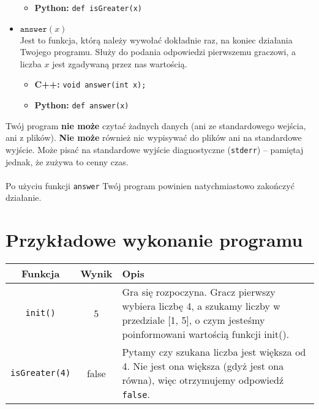 \documentclass[zad,zawodnik,utf8]{sinol}
\begin{document}
\begin{tasktext}
\begin{itemize}
\begin{itemize}
                \item \textbf{Python:}
		                \texttt{def isGreater(x)}
            \end{itemize}

        \item $\texttt{answer}(x)$ \\
            Jest to funkcja, którą należy wywołać dokładnie raz,
            na koniec działania Twojego programu.
            Służy do podania odpowiedzi pierwszemu graczowi,
            a liczba $x$ jest zgadywaną przez nas wartością.
            \begin{itemize}
                \item \textbf{C++:}
		                \texttt{void answer(int x);}
                \item \textbf{Python:}
		                \texttt{def answer(x)}
            \end{itemize}
    \end{itemize}

    \noindent Twój program \textbf{nie może} czytać żadnych danych
    (ani ze standardowego wejścia, ani z plików).
    \textbf{Nie może} również nic wypisywać do plików ani na standardowe wyjście.
    Może pisać na standardowe wyjście diagnostyczne
    (\texttt{stderr}) -- pamiętaj jednak, że zużywa to cenny czas.\\
    \\
    Po użyciu funkcji \texttt{answer} Twój program powinien
    natychmiastowo zakończyć działanie.

\section{Przykładowe wykonanie programu}
    \begin{tabular}{|c|c|p{12.5cm}|}
        \hline

        \textbf{Funkcja} & \textbf{Wynik} & \textbf{Opis} \\ \hline

        \texttt{init()} & 5 &
        Gra się rozpoczyna. Gracz pierwszy wybiera liczbę 4,
        a szukamy liczby w przedziale [1, 5], o czym jesteśmy poinformowani
        wartością funkcji init().
        \\ \hline

        \texttt{isGreater(4)} & false &
        Pytamy czy szukana liczba jest większa od 4.
        Nie jest ona większa (gdyż jest ona równa),
        więc otrzymujemy odpowiedź \texttt{false}. 
        \\ \hline


\end{tabular}
\end{tasktext}
\end{document}
